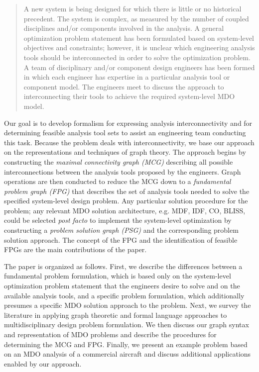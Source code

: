     \begin{quote}
    A new system is being designed for which there is little or no historical precedent. The system
    is complex, as measured by the number of coupled disciplines and/or components involved in the
    analysis. A general optimization problem statement has been formulated based on system-level objectives and constraints; however, it is unclear which engineering analysis tools should
    be interconnected in order to solve the optimization problem. A team of disciplinary and/or component design engineers has been formed in which each engineer has expertise in a
    particular analysis tool or component model. The engineers meet to discuss the approach to
    interconnecting their tools to achieve the required system-level MDO model.
    \end{quote}

    Our goal is to develop formalism for expressing analysis interconnectivity and for determining feasible
    analysis tool sets to assist an engineering team conducting this task. Because the problem deals with
    interconnectivity, we base our approach on the representations and techniques of graph theory.
    The approach begins by constructing the \emph{maximal connectivity graph (MCG)} describing all possible
    interconnections between the analysis tools proposed by the engineers. Graph operations are then
    conducted to reduce the MCG down to a \emph{fundamental problem graph (FPG)} that describes the set of analysis
    tools needed to solve the specified system-level design problem.
    Any particular solution procedure for the problem; any relevant MDO solution architecture, e.g. MDF,
    IDF, CO, BLISS, could be selected \emph{post facto} to implement the system-level optimization by
    constructing a \emph{problem solution graph (PSG)} and the corresponding problem solution approach.
    The concept of the FPG and the identification of feasible FPGs are the main contributions of the paper.

    The paper is organized as follows. First, we describe the differences between a fundamental problem
    formulation, which is based only on the system-level optimization problem statement that the
    engineers desire to solve and on the available analysis tools, and a specific problem formulation, which
    additionally presumes a specific MDO solution approach to the problem. Next, we survey the literature in applying
    graph theoretic and formal language approaches to multidisciplinary design problem formulation. 
    We then discuss our graph syntax and representation of MDO problems and describe the procedures for 
    determining the MCG and FPG. Finally, we present an example problem based on an MDO analysis of a 
    commercial aircraft and discuss additional applications enabled by our approach.


